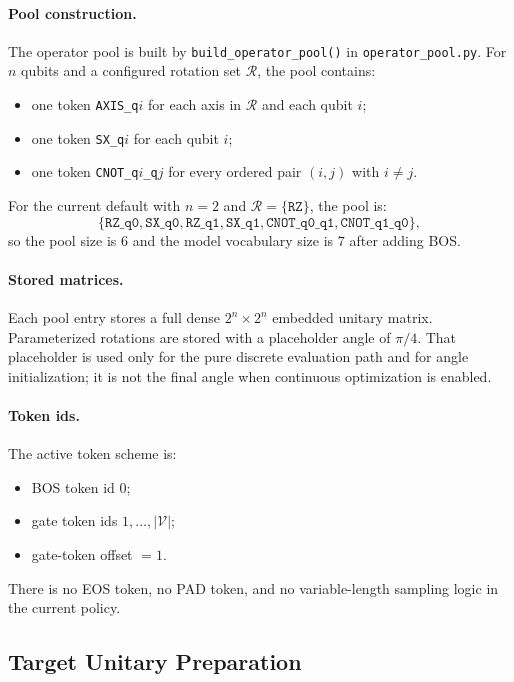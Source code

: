 \documentclass[11pt]{article}
\begin{document}
\paragraph{Pool construction.}
The operator pool is built by \texttt{build\_operator\_pool()} in \texttt{operator\_pool.py}. For $n$ qubits and a configured rotation set $\mathcal{R}$, the pool contains:
\begin{itemize}[leftmargin=*]
\item one token \texttt{AXIS\_q$i$} for each axis in $\mathcal{R}$ and each qubit $i$;
\item one token \texttt{SX\_q$i$} for each qubit $i$;
\item one token \texttt{CNOT\_q$i$\_q$j$} for every ordered pair $(i,j)$ with $i \ne j$.
\end{itemize}

For the current default with $n=2$ and $\mathcal{R}=\{\texttt{RZ}\}$, the pool is:
\[
\{\texttt{RZ\_q0}, \texttt{SX\_q0}, \texttt{RZ\_q1}, \texttt{SX\_q1}, \texttt{CNOT\_q0\_q1}, \texttt{CNOT\_q1\_q0}\},
\]
so the pool size is $6$ and the model vocabulary size is $7$ after adding BOS.

\paragraph{Stored matrices.}
Each pool entry stores a full dense $2^n \times 2^n$ embedded unitary matrix.
Parameterized rotations are stored with a placeholder angle of $\pi/4$.
That placeholder is used only for the pure discrete evaluation path and for angle initialization; it is not the final angle when continuous optimization is enabled.

\paragraph{Token ids.}
The active token scheme is:
\begin{itemize}[leftmargin=*]
\item BOS token id $0$;
\item gate token ids $1,\dots,|\mathcal{V}|$;
\item gate-token offset $=1$.
\end{itemize}

There is no EOS token, no PAD token, and no variable-length sampling logic in the current policy.

\subsection{Target Unitary Preparation}
\end{document}
